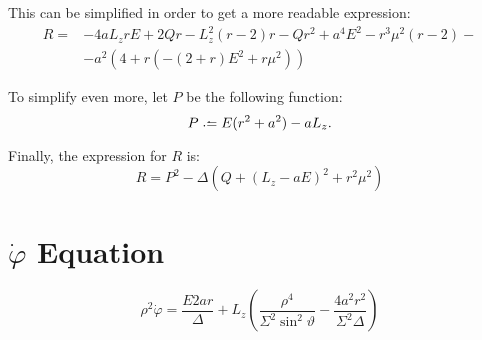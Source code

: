 This can be simplified in order to get a more readable expression:
\begin{align*}
	R = &-4aL_zrE + 2Qr - L_z^2(r-2)r - Qr^2 + a^4E^2 - r^3\mu^2(r-2) - \\
	&- a^2\left(4 + r\left(-\left(2+r\right)E^2 + r\mu^2\right)\right)
\end{align*}

To simplify even more, let $P$ be the following function:
\begin{equation}
	\label{eq:defP}
	P \defeq E(r^2 + a^2) - aL_z.
\end{equation}

Finally, the expression for $R$ is:
\[
	R = P^2 - \Delta\left(Q + \left(L_z - aE\right)^2 + r^2 \mu^2\right)
\]

\section{$\dot{\varphi}$ Equation}
\[
	\rho^2 \dot{\varphi} = \frac{E2ar}{\Delta} + L_z\left( \frac{\rho^4}{\Sigma^2\sin^2\vartheta} - \frac{4a^2r^2}{\Sigma^2\Delta} \right)
\]
